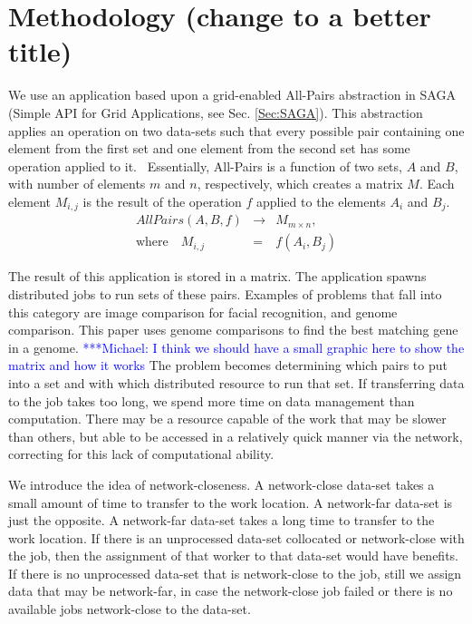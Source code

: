 \documentclass{rspublic}
\newcommand{\micnote}[1]{ {\textcolor{blue} { ***Michael: #1 }}}
\begin{document}
\section {Methodology (change to a better title)} We use an application
based upon a grid-enabled All-Pairs abstraction in SAGA (Simple API for
Grid Applications, see Sec. \ref{Sec:SAGA}). This abstraction applies an
operation on two data-sets such that every possible pair containing one
element from the first set and one element from the second set has some
operation applied to it.~\citep{Interop, AllPairs} Essentially,
All-Pairs is a function of two sets, $A$ and $B$, with number of
elements $m$ and $n$, respectively, which creates a matrix $M$. Each
element $M_{i,j}$ is the result of the operation $f$ applied to the
elements $A_i$ and $B_j$.
\begin{eqnarray}
 AllPairs(A, B, f) & \rightarrow & M_{m \times n}, \\
\mbox{where} \quad M_{i,j} & = & f(A_{i},B_{j})
 \end{eqnarray}
 
The result of this application is stored in a matrix. The application
spawns distributed jobs to run sets of these pairs. Examples of
problems that fall into this category are image comparison for facial
recognition, and genome comparison. This paper uses genome comparisons
to find the best matching gene in a genome. \micnote{I think we should
have a small graphic here to show the matrix and how it works} The
problem becomes determining which pairs to put into a set and with which
distributed resource to run that set. If transferring data to the job
takes too long, we spend more time on data management than computation.
There may be a resource capable of the work that may be slower than
others, but able to be accessed in a relatively quick manner via the
network, correcting for this lack of computational ability. 

We introduce the idea of network-closeness. A network-close data-set
takes a small amount of time to transfer to the work location. A
network-far data-set is just the opposite. A network-far data-set takes
a long time to transfer to the work location. If there is an
unprocessed data-set collocated or network-close with the job, then the
assignment of that worker to that data-set would have benefits. If
there is no unprocessed data-set that is network-close to the job, still
we assign data that may be network-far, in case the network-close job
failed or there is no available jobs network-close to the data-set.
\end{document}
